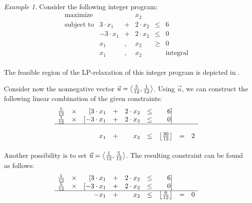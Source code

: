 \documentclass[titlepage]{book}
\theoremstyle{plain}
\theoremstyle{definition}
\theoremstyle{remark}
\newtheorem{example}{Example}
\begin{document}
\paragraph{}
\begin{example}
Consider the following integer program:
\begin{equation}
\begin{array}{rrcrcr}
\mbox{maximize}&&&x_2\\
\mbox{subject to}&3\cdot x_1&+&2\cdot x_2&\leq&6\\
&-3\cdot x_1&+&2\cdot x_2&\leq&0\\
&x_1&,&x_2&\geq&0\\
&x_1&,&x_2&&\mbox{integral}
\end{array}
\end{equation}

\paragraph{}
The feasible region of the LP-relaxation of this integer program is depicted in .



Consider now the nonnegative vector $\vec{u}=\left\langle \tfrac{5}{12},\tfrac{1}{12} \right\rangle$. Using $\vec{u}$, we can construct the following linear combination of the given constraints:
\begin{equation}
\begin{array}{rcrcrcrcr}
\tfrac{5}{12}&\times&[3\cdot x_1&+&2\cdot x_2&\leq&6]&&\\
\tfrac{1}{12}&\times&[-3\cdot x_1&+&2\cdot x_2&\leq&0]&&\\\hline\\
&&x_1&+&x_2&\leq&\left\lfloor \tfrac{30}{12} \right\rfloor&=&2
\end{array}
\end{equation}

\paragraph{}
Another possibility is to set $\vec{u}=\left\langle \tfrac{1}{12},\tfrac{5}{12} \right\rangle$. The resulting constraint can be found as follows:
\begin{equation}
\begin{array}{rcrcrcrcr}
\tfrac{1}{12}&\times&[3\cdot x_1&+&2\cdot x_2&\leq&6]&&\\
\tfrac{5}{12}&\times&[-3\cdot x_1&+&2\cdot x_2&\leq&0]&&\\\hline
&&-x_1&+&x_2&\leq&\left\lfloor \tfrac{6}{12} \right\rfloor&=&0
\end{array}
\end{equation}


\end{example}
\end{document}
